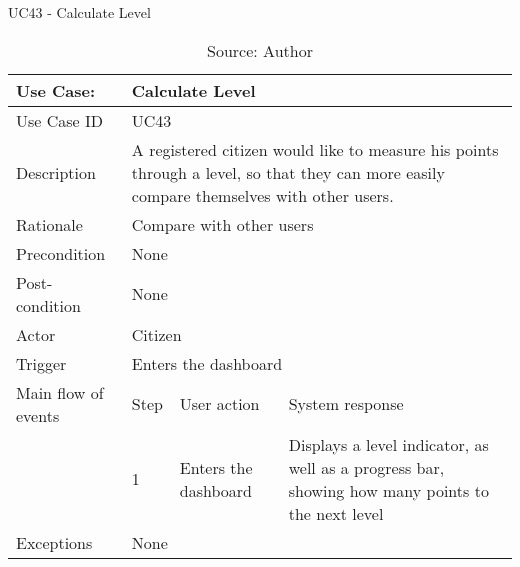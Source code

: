 \begin{table}[ht]
\centering
\caption{UC43 - Calculate Level}
\label{uc:43}
\begin{tabular}{|p{3cm}|p{1cm}|p{5cm}|p{5cm}|}
\hline
Use Case:       & \multicolumn{3}{p{11cm}|}{Calculate Level} \\ \hline
Use Case ID     & \multicolumn{3}{p{11cm}|}{UC43} \\ \hline
Description     & \multicolumn{3}{p{11cm}|}{A registered citizen would like to measure his points through a level, so that they can more easily compare themselves with other users.} \\ \hline
Rationale       & \multicolumn{3}{p{11cm}|}{Compare with other users} \\ \hline
Precondition    & \multicolumn{3}{p{11cm}|}{None} \\ \hline
Post-condition  & \multicolumn{3}{p{11cm}|}{None} \\ \hline
Actor           & \multicolumn{3}{p{11cm}|}{Citizen} \\ \hline
Trigger         & \multicolumn{3}{p{11cm}|}{Enters the dashboard} \\ \hline
Main flow of events & Step  & User action & System response \\ \hline
                    & 1     & Enters the dashboard & Displays a level indicator, as well as a progress bar, showing how many points to the next level \\ \hline
Exceptions      & \multicolumn{3}{p{11cm}|}{None} \\ \hline
\end{tabular}
\caption*{Source: Author}
\end{table}

